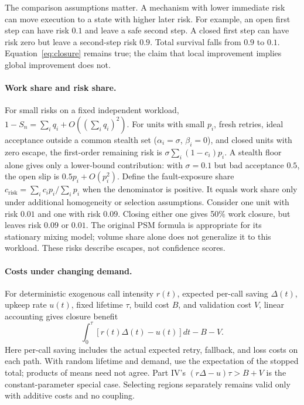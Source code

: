\documentclass[11pt]{article}
\theoremstyle{definition}
\theoremstyle{remark}
\begin{document}
The comparison assumptions matter. A mechanism with lower immediate risk can move execution
to a state with higher later risk. For example, an open first step can have risk $0.1$ and
leave a safe second step. A closed first step can have risk zero but leave a second-step risk
$0.9$. Total survival falls from $0.9$ to $0.1$. Equation~\eqref{eq:closure} remains true;
the claim that local improvement implies global improvement does not.

\paragraph{Work share and risk share.}
For small risks on a fixed independent workload, $1-S_n=\sum_iq_i+O((\sum_iq_i)^2)$.
For units with small $p_i$, fresh retries, ideal acceptance outside a common stealth set
($\alpha_i=\sigma$, $\beta_i=0$), and closed units with zero escape, the first-order remaining
risk is $\sigma\sum_i(1-c_i)p_i$. A stealth floor alone gives only a lower-bound contribution:
with $\sigma=0.1$ but bad acceptance $0.5$, the open slip is $0.5p_i+O(p_i^2)$.
Define the fault-exposure share $c_{\mathrm{risk}}=\sum_i c_i p_i/\sum_i p_i$ when the denominator
is positive. It equals work share only under additional homogeneity or selection assumptions.
Consider one unit with risk $0.01$ and one with risk $0.09$. Closing either one gives 50\%
work closure, but leaves risk $0.09$ or $0.01$. The original PSM formula is appropriate for
its stationary mixing model; volume share alone does not generalize it to this workload.
These risks describe escapes, not confidence scores.

\paragraph{Costs under changing demand.}
For deterministic exogenous call intensity $r(t)$, expected per-call saving $\Delta(t)$,
upkeep rate $u(t)$, fixed lifetime $\tau$, build cost $B$, and validation cost $V$, linear
accounting gives closure benefit
\begin{equation}\label{eq:benefit}
\int_0^\tau[r(t)\Delta(t)-u(t)]dt-B-V.
\end{equation}
Here per-call saving includes the actual expected retry, fallback, and loss costs on each path.
With random lifetime and demand, use the expectation of the stopped total; products of means
need not agree. Part IV's $(r\Delta-u)\tau>B+V$ is the constant-parameter special case.
Selecting regions separately remains valid only with additive costs and no coupling.
\end{document}
